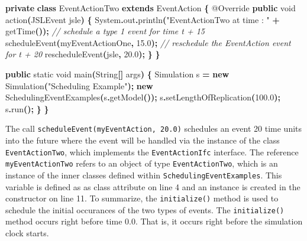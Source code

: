 \documentclass[
]{book}
\newenvironment{Shaded}{\begin{snugshade}}{\end{snugshade}}
\newcommand{\AttributeTok}[1]{\textcolor[rgb]{0.77,0.63,0.00}{#1}}
\newcommand{\BuiltInTok}[1]{#1}
\newcommand{\CommentTok}[1]{\textcolor[rgb]{0.56,0.35,0.01}{\textit{#1}}}
\newcommand{\DataTypeTok}[1]{\textcolor[rgb]{0.13,0.29,0.53}{#1}}
\newcommand{\FloatTok}[1]{\textcolor[rgb]{0.00,0.00,0.81}{#1}}
\newcommand{\FunctionTok}[1]{\textcolor[rgb]{0.00,0.00,0.00}{#1}}
\newcommand{\KeywordTok}[1]{\textcolor[rgb]{0.13,0.29,0.53}{\textbf{#1}}}
\newcommand{\NormalTok}[1]{#1}
\newcommand{\OperatorTok}[1]{\textcolor[rgb]{0.81,0.36,0.00}{\textbf{#1}}}
\newcommand{\StringTok}[1]{\textcolor[rgb]{0.31,0.60,0.02}{#1}}
\theoremstyle{definition}
\theoremstyle{definition}
\theoremstyle{definition}
\theoremstyle{definition}
\theoremstyle{remark}
\begin{document}
\begin{Shaded}
\begin{Highlighting}[]
    \KeywordTok{private} \KeywordTok{class}\NormalTok{ EventActionTwo }\KeywordTok{extends}\NormalTok{ EventAction }\OperatorTok{\{}
        \AttributeTok{@Override}
        \KeywordTok{public} \DataTypeTok{void} \FunctionTok{action}\OperatorTok{(}\NormalTok{JSLEvent jsle}\OperatorTok{)} \OperatorTok{\{}
            \BuiltInTok{System}\OperatorTok{.}\FunctionTok{out}\OperatorTok{.}\FunctionTok{println}\OperatorTok{(}\StringTok{"EventActionTwo at time : "} \OperatorTok{+} \FunctionTok{getTime}\OperatorTok{());}
            \CommentTok{// schedule a type 1 event for time t + 15}
            \FunctionTok{scheduleEvent}\OperatorTok{(}\NormalTok{myEventActionOne}\OperatorTok{,} \FloatTok{15.0}\OperatorTok{);}
            \CommentTok{// reschedule the EventAction event for t + 20}
            \FunctionTok{rescheduleEvent}\OperatorTok{(}\NormalTok{jsle}\OperatorTok{,} \FloatTok{20.0}\OperatorTok{);}
        \OperatorTok{\}}
    \OperatorTok{\}}

    \KeywordTok{public} \DataTypeTok{static} \DataTypeTok{void} \FunctionTok{main}\OperatorTok{(}\BuiltInTok{String}\OperatorTok{[]}\NormalTok{ args}\OperatorTok{)} \OperatorTok{\{}
\NormalTok{        Simulation s }\OperatorTok{=} \KeywordTok{new} \FunctionTok{Simulation}\OperatorTok{(}\StringTok{"Scheduling Example"}\OperatorTok{);}
        \KeywordTok{new} \FunctionTok{SchedulingEventExamples}\OperatorTok{(}\NormalTok{s}\OperatorTok{.}\FunctionTok{getModel}\OperatorTok{());}
\NormalTok{        s}\OperatorTok{.}\FunctionTok{setLengthOfReplication}\OperatorTok{(}\FloatTok{100.0}\OperatorTok{);}
\NormalTok{        s}\OperatorTok{.}\FunctionTok{run}\OperatorTok{();}
    \OperatorTok{\}}
\OperatorTok{\}}
\end{Highlighting}
\end{Shaded}

The call \texttt{scheduleEvent(myEventAction,\ 20.0)} schedules an event 20 time
units into the future where the event will be handled via the instance
of the class \texttt{EventActionTwo}, which implements the \texttt{EventActionIfc} interface.
The reference \texttt{myEventActionTwo} refers to an object of type \texttt{EventActionTwo},
which is an instance of the inner classes defined within
\texttt{SchedulingEventExamples}. This variable is defined as as class attribute
on line 4 and an instance is created in the constructor on line 11. To
summarize, the \texttt{initialize()} method is used to schedule the initial occurances of the two types of events. The \texttt{initialize()} method occurs right before time 0.0. That is, it occurs right before the simulation clock starts.
\end{document}
